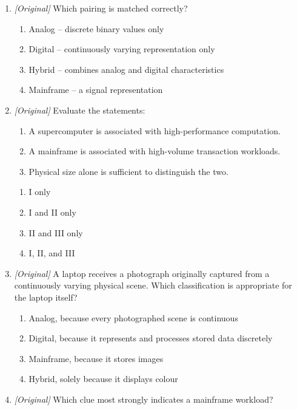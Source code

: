\begin{enumerate}[label=\textbf{Q\arabic*.}, leftmargin=*]
\begin{enumerate}[label=\Alph*.]
    \item Analog
  \end{enumerate}
\item \textit{[Original]} Which pairing is matched correctly?
  \begin{enumerate}[label=\Alph*.]
    \item Analog -- discrete binary values only
    \item Digital -- continuously varying representation only
    \item Hybrid -- combines analog and digital characteristics
    \item Mainframe -- a signal representation
  \end{enumerate}
\item \textit{[Original]} Evaluate the statements:
  \begin{enumerate}[label=\Roman*.]
    \item A supercomputer is associated with high-performance computation.
    \item A mainframe is associated with high-volume transaction workloads.
    \item Physical size alone is sufficient to distinguish the two.
  \end{enumerate}
  \begin{enumerate}[label=\Alph*.]
    \item I only
    \item I and II only
    \item II and III only
    \item I, II, and III
  \end{enumerate}
\item \textit{[Original]} A laptop receives a photograph originally captured
  from a continuously varying physical scene. Which classification is
  appropriate for the laptop itself?
  \begin{enumerate}[label=\Alph*.]
    \item Analog, because every photographed scene is continuous
    \item Digital, because it represents and processes stored data discretely
    \item Mainframe, because it stores images
    \item Hybrid, solely because it displays colour
  \end{enumerate}
\item \textit{[Original]} Which clue most strongly indicates a mainframe
  workload?
  \begin{enumerate}[label=\Alph*.]

\end{enumerate}
\end{enumerate}
